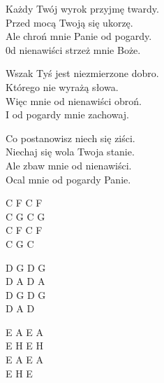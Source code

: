 \begin{text}

    Każdy Twój wyrok przyjmę twardy.\\
    Przed mocą Twoją się ukorzę.\\
    Ale chroń mnie Panie od pogardy.\\
    0d nienawiści strzeż mnie Boże.

    Wszak Tyś jest niezmierzone dobro.\\
    Którego nie wyrażą słowa.\\
    Więc mnie od nienawiści obroń.\\
    I od pogardy mnie zachowaj.

    Co postanowisz niech się ziści.\\
    Niechaj się wola Twoja stanie.\\
    Ale zbaw mnie od nienawiści.\\
    Ocal mnie od pogardy Panie.



\end{text}
\begin{chord}

    C F C F\\
    C G C G\\
    C F C F\\
    C G C

    D G D G\\
    D A D A\\
    D G D G\\
    D A D

    E A E A\\
    E H E H\\
    E A E A\\
    E H E



\end{chord}